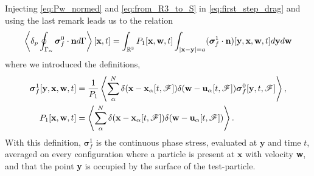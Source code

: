 Injecting \ref{eq:Pw_normed} and \ref{eq:from_R3_to_S} in \ref{eq:first_step_drag} and using the last remark leads us to the relation 
\begin{equation}
    \pSavg{\bm\sigma_f^0\cdot\textbf{n}}[\textbf{x},t]
    =
    \int_{\mathbb{R}^3}
    P_1[\textbf{x},\textbf{w},t]
    \int_{|\textbf{x}-\textbf{y}|=a}
    (\bm\sigma_f^1 \cdot \textbf{n})[\textbf{y},\textbf{x},\textbf{w},t]
    d\textbf{y}
    d\textbf{w}
    \label{eq:conditionally_averaged}
\end{equation}
where we introduced the definitions, 
\begin{align}
    \bm\sigma^1_f[\textbf{y},\textbf{x},\textbf{w},t]
    &= 
    \frac{1}{P_1}
    \avg{
    \sum_\alpha^N 
    \delta(\textbf{x} - \textbf{x}_\alpha[t,\FF])
    \delta(\textbf{w} - \textbf{u}_\alpha[t,\FF])
    \bm\sigma_f^0[\textbf{y},t,\FF]
    },
    \label{eq:sigma_f_1}
    \\
    P_1[\textbf{x},\textbf{w},t]
    &= 
    \avg{
    \sum_\alpha^N 
    \delta(\textbf{x} - \textbf{x}_\alpha[t,\FF])
    \delta(\textbf{w} - \textbf{u}_\alpha[t,\FF])
    }. 
\end{align}
With this definition, $\bm\sigma^1_f$ is the continuous phase stress, evaluated at $\textbf{y}$ and time $t$, averaged on every configuration where a particle is present at $\textbf{x}$ with velocity \textbf{w}, and that the point \textbf{y} is occupied by the surface of the test-particle.
